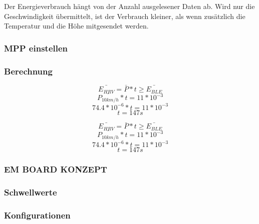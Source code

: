 Der Energieverbrauch hängt von der Anzahl ausgelesener Daten ab. Wird nur die Geschwindigkeit übermittelt, ist der Verbrauch kleiner, als wenn zusätzlich die Temperatur und die Höhe mitgesendet werden.


\subsubsection{MPP einstellen}

%
% 
%

\subsubsection*{Berechnung}

\[\bar{E_{HRV}} = \bar{P} * t \ge \bar{E_{BLE}}  \]
\[\bar{P_{10km/h}} * t = 11 * 10^{-3}  \]
\[74.4 * 10^{-6} * t = 11 * 10^{-3}   \]
\[t = 147 s  \]

\[\bar{E_{HRV}} = \bar{P} * t \ge \bar{E_{BLE}}  \]
\[\bar{P_{10km/h}} * t = 11 * 10^{-3}  \]
\[74.4 * 10^{-6} * t = 11 * 10^{-3}   \]
\[t = 147 s  \]

\subsubsection*{EM BOARD KONZEPT}
\subsubsection*{Schwellwerte}
\subsubsection*{Konfigurationen}


